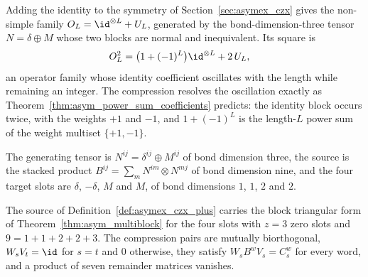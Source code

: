 Adding the identity to the symmetry of Section~\ref{sec:asymex_czx} gives
the non-simple family $O_L=\id^{\otimes L}+U_L$, generated by the
bond-dimension-three tensor $N=\delta\oplus M$ whose two blocks are normal
and inequivalent. Its square is
\begin{align}
    O_L^2 & =\bigl(1+(-1)^L\bigr)\id^{\otimes L}+2\,U_L,
    \label{eq:asymex_czx_plus_square}
\end{align}
an operator family whose identity coefficient oscillates with the length
while remaining an integer. The compression resolves the oscillation
exactly as Theorem~\ref{thm:asym_power_sum_coefficients} predicts: the
identity block occurs twice, with the weights $+1$ and $-1$, and
$1+(-1)^L$ is the length-$L$ power sum of the weight multiset
$\{+1,-1\}$.

\begin{definition}
    \label{def:asymex_czx_plus}
    \leanok
    The generating tensor is $N^{ij}=\delta^{ij}\oplus M^{ij}$ of bond
    dimension three, the source is the stacked product
    $B^{ij}=\sum_mN^{im}\otimes N^{mj}$ of bond dimension nine, and the four
    target slots are $\delta$, $-\delta$, $M$ and $M$, of bond dimensions
    $1$, $1$, $2$ and $2$.
\end{definition}

\begin{theorem}
    \label{thm:asymex_czx_plus_compression}
    \leanok
    The source of Definition~\ref{def:asymex_czx_plus} carries the block
    triangular form of Theorem~\ref{thm:asym_multiblock} for the four
    slots with $z=3$ zero slots and $9=1+1+2+2+3$. The compression pairs
    are mutually biorthogonal, $W_sV_t=\id$ for $s=t$ and $0$ otherwise,
    they satisfy $W_sB^wV_s=C_s^w$ for every word, and a product of seven
    remainder matrices vanishes.
\end{theorem}

